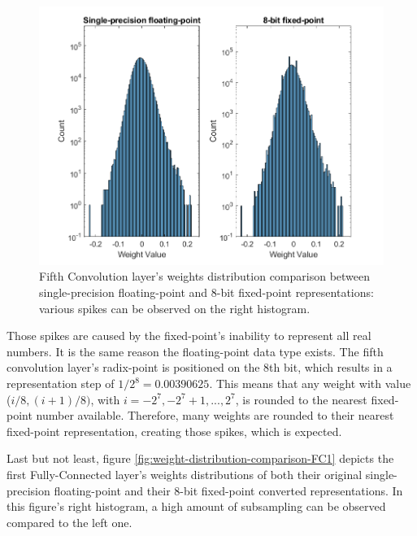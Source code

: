 \begin{figure} [H]
	\centering
	\includegraphics[scale=0.9]{../Images/Weights-distributions/original-vs-fixed8/weight-distribution-conv5.png}
	\decoRule
	\caption[Fifth Convolution layer's weights distribution comparison between single-precision floating-point and 8-bit fixed-point representations]{Fifth Convolution layer's weights distribution comparison between single-precision floating-point and 8-bit fixed-point representations: various spikes can be observed on the right histogram.}
	\label{fig:weight-distribution-comparison-conv5}
\end{figure}

Those spikes are caused by the fixed-point's inability to represent all real numbers. It is the same reason the floating-point data type exists. The fifth convolution layer's radix-point is positioned on the 8th bit, which results in a representation step of $1/2^8 = 0.00390625$. This means that any weight with value ($i/8, (i + 1)/8)$, with $i=-2^7, -2^7 + 1, ..., 2^7$, is rounded to the nearest fixed-point number available. Therefore, many weights are rounded to their nearest fixed-point representation, creating those spikes, which is expected.

Last but not least, figure \ref{fig:weight-distribution-comparison-FC1} depicts the first Fully-Connected layer's weights distributions of both their original single-precision floating-point and their 8-bit fixed-point converted representations. In this figure's right histogram, a high amount of subsampling can be observed compared to the left one.

